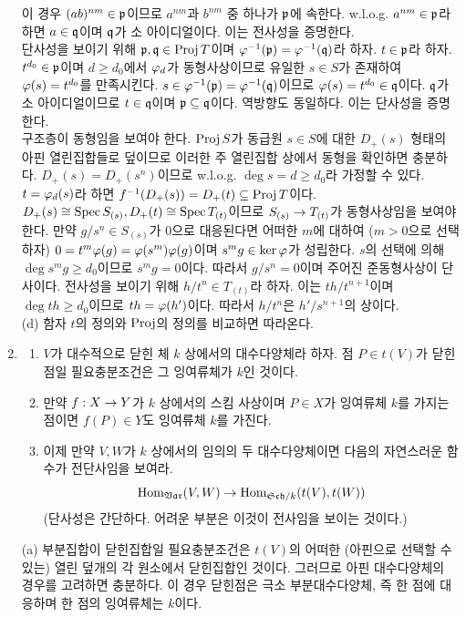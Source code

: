 \begin{enumerate}[label=\tb{2.\arabic*.},itemindent=0mm,itemsep=4mm]
	이 경우 $(ab)^{nm}\in\mathfrak{p}$이므로 $a^{nm}$과 $b^{nm}$ 중 하나가 $\mathfrak{p}$에 속한다.
	w.l.o.g. $a^{nm}\in\mathfrak{p}$라 하면 $a\in\mathfrak{q}$이며 $\mathfrak{q}$가 소 아이디얼이다. 이는 전사성을 증명한다.\\
	단사성을 보이기 위해 $\mathfrak{p},\mathfrak{q}\in\operatorname{Proj} T$이며 $\varphi^{-1}(\mathfrak{p})=\varphi^{-1}(\mathfrak{q})$라 하자.
	$t\in\mathfrak{p}$라 하자. $t^{d_0}\in\mathfrak{p}$이며 $d\ge d_0$에서 $\varphi_d$가 동형사상이므로
	유일한 $s\in S$가 존재하여 $\varphi(s)=t^{d_0}$를 만족시킨다.
	$s\in\varphi^{-1}(\mathfrak{p})=\varphi^{-1}(\mathfrak{q})$이므로 $\varphi(s)=t^{d_0}\in\mathfrak{q}$이다.
	$\mathfrak{q}$가 소 아이디얼이므로 $t\in\mathfrak{q}$이며 $\mathfrak{p}\subseteq\mathfrak{q}$이다. 역방향도 동일하다. 이는 단사성을 증명한다.\\
	구조층이 동형임을 보여야 한다. $\operatorname{Proj} S$가 동급원 $s\in S$에 대한 $D_+(s)$ 형태의 아핀 열린집합들로 덮이므로
	이러한 주 열린집합 상에서 동형을 확인하면 충분하다. $D_+(s)=D_+(s^n)$이므로 w.l.o.g. $\deg s=d\ge d_0$라 가정할 수 있다.
	$t=\varphi_d(s)$라 하면 $f^{-1}(D_+(s))=D_+(t)\subseteq\operatorname{Proj} T$이다.
	$D_+(s)\cong\operatorname{Spec} S_{(s)},D_+(t)\cong\operatorname{Spec} T_{(t)}$이므로 $S_{(s)}\rightarrow T_{(t)}$가 동형사상임을 보여야 한다.
	만약 $g/s^n\in S_{(s)}$가 $0$으로 대응된다면 어떠한 $m$에 대하여 ($m>0$으로 선택하자) $0=t^m\varphi(g)=\varphi(s^m)\varphi(g)$이며
	$s^mg\in\ker\varphi$가 성립한다. $s$의 선택에 의해 $\deg s^mg\ge d_0$이므로 $s^mg=0$이다.
	따라서 $g/s^n=0$이며 주어진 준동형사상이 단사이다.
	전사성을 보이기 위해 $h/t^n\in T_{(t)}$라 하자. 이는 $th/t^{n+1}$이며 $\deg th\ge d_0$이므로 $th=\varphi(h')$이다.
	따라서 $h/t^n$은 $h'/s^{n+1}$의 상이다.\\
	(d) 함자 $t$의 정의와 $\mathrm{Proj}$의 정의를 비교하면 따라온다.
	\item \begin{enumerate}[label=(\alph*)]
	\item $V$가 대수적으로 닫힌 체 $k$ 상에서의 대수다양체라 하자. 점 $P\in t(V)$가 닫힌점일 필요충분조건은 그 잉여류체가 $k$인 것이다.
	\item 만약 $f:X\rightarrow Y$가 $k$ 상에서의 스킴 사상이며 $P\in X$가 잉여류체 $k$를 가지는 점이면 $f(P)\in Y$도 잉여류체 $k$를 가진다.
	\item 이제 만약 $V,W$가 $k$ 상에서의 임의의 두 대수다양체이면 다음의 자연스러운 함수가 전단사임을 보여라.
	$$\operatorname{Hom}_{\mathfrak{Var}}(V,W)\rightarrow\operatorname{Hom}_{\mathfrak{Sch}/k}(t(V),t(W))$$
	(단사성은 간단하다. 어려운 부분은 이것이 전사임을 보이는 것이다.)
	\end{enumerate}
	\sol (a) 부분집합이 닫힌집합일 필요충분조건은 $t(V)$의 어떠한 (아핀으로 선택할 수 있는) 열린 덮개의 각 원소에서 닫힌집합인 것이다.
	그러므로 아핀 대수다양체의 경우를 고려하면 충분하다.
	이 경우 닫힌점은 극소 부분대수다양체, 즉 한 점에 대응하며 한 점의 잉여류체는 $k$이다.\\

\end{enumerate}
